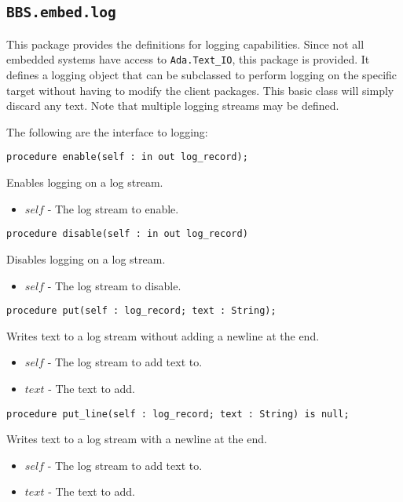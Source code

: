 \documentclass[10pt, openany]{book}
\newcommand{\indexfunc}[1]{\index[func]{#1}}
\newcommand{\package}[1]{\texttt{#1}}
\begin{document}
\subsection{\package{BBS.embed.log}}
This package provides the definitions for logging capabilities.  Since not all embedded systems have access to \package{Ada.Text\_IO}, this package is provided.  It defines a logging object that can be subclassed to perform logging on the specific target without having to modify the client packages.  This basic class will simply discard any text.  Note that multiple logging streams may be defined.

The following are the interface to logging:
\begin{lstlisting}
procedure enable(self : in out log_record);
\end{lstlisting}
\indexfunc{enable}
Enables logging on a log stream.
\begin{itemize}
  \item $self$ - The log stream to enable.
\end{itemize}

\begin{lstlisting}
procedure disable(self : in out log_record)
\end{lstlisting}
\indexfunc{disable}
Disables logging on a log stream.
\begin{itemize}
  \item $self$ - The log stream to disable.
\end{itemize}

\begin{lstlisting}
procedure put(self : log_record; text : String);
\end{lstlisting}
\indexfunc{put}
Writes text to a log stream without adding a newline at the end.
\begin{itemize}
  \item $self$ - The log stream to add text to.
  \item $text$ - The text to add.
\end{itemize}

\begin{lstlisting}
procedure put_line(self : log_record; text : String) is null;
\end{lstlisting}
\indexfunc{put\_line}
Writes text to a log stream with a newline at the end.
\begin{itemize}
  \item $self$ - The log stream to add text to.
  \item $text$ - The text to add.
\end{itemize}
\end{document}
